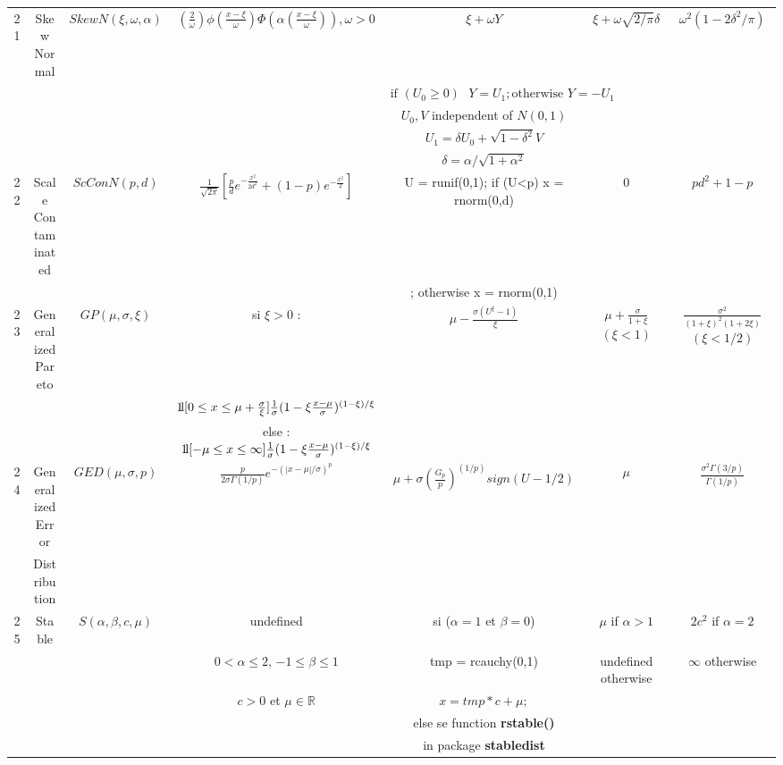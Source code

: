 \documentclass[10pt]{article}
\def\ind {\mbox {\rm 1\!\!\,l}} %
\begin{document}
\begin{landscape}
\begin{center}
{\begin{longtable}{|c|c|c|c|c|c|c|}
\hline
21 & Skew Normal & $SkewN(\xi,\omega,\alpha)$ & $\left(\frac{2}{\omega}\right)\phi\left(\frac{x-\xi}{\omega}\right)\Phi\left(\alpha\left(\frac{x-\xi}{\omega}\right)\right), \omega > 0$ & $\xi+\omega Y$& $\xi+\omega\sqrt{2/\pi}\delta$ & $\omega^2(1-2\delta^2/\pi)$\\
 & & & & $\text{if } (U_0 \geq 0) \text{ } Y = U_1; \text{otherwise } Y = -U_1$ & &\\
 & & & & $U_0, V$ independent of $N(0,1)$ & &\\
 & & & & $U_1=\delta U_0+\sqrt{1-\delta^2}V$ & &\\
 & & & & $\delta=\alpha/\sqrt{1+\alpha^2}$ & &\\
\hline
22 & Scale Contaminated & $ScConN(p,d)$ & $\frac{1}{\sqrt{2\pi}}\left[\frac{p}{d}e^{-\frac{x^2}{2d^2}}+(1-p)e^{-\frac{x^2}{2}}\right]$
         & U = runif(0,1); if (U<p) x = rnorm(0,d) & 0 & $pd^2+1-p$\\
   & & & & ; otherwise x = rnorm(0,1) & & \\
\hline
23 & Generalized Pareto & $GP(\mu,\sigma,\xi)$
   & si $\xi > 0$ : & $\mu-\frac{\sigma(U^{\xi}-1)}{\xi}$ & $\mu+\frac{\sigma}{1+\xi}$ $(\xi<1)$  & $\frac{\sigma^2}{(1+\xi)^2(1+2\xi)}$ $(\xi<1/2)$ \\
   & & & $\ind[0 \leq x \leq \mu+\frac{\sigma}{\xi}] \frac{1}{\sigma} (1-\xi\frac{x-\mu}{\sigma})^{(1-\xi)/\xi}$ & & &\\
   & & & else : $\ind[-\mu \leq x \leq \infty] \frac{1}{\sigma} (1-\xi\frac{x-\mu}{\sigma})^{(1-\xi)/\xi}$  & & &\\
\hline
24 & Generalized Error & $GED(\mu,\sigma,p)$ & $\frac{p}{2\sigma\Gamma(1/p)}e^{-\left(|x-\mu|/\sigma\right)^p}$ & $\mu+\sigma\left(\frac{G_p}{p}\right)^{(1/p)}sign(U-1/2)$ &  $\mu$ & $\frac{\sigma^2\Gamma(3/p)}{\Gamma(1/p)}$ \\
   & Distribution & & & & & \\
\hline
25 & Stable & $S(\alpha,\beta,c,\mu)$ & undefined & si ($\alpha = 1$ et $\beta = 0$) & $\mu$ if $\alpha > 1$ & $2c^2$ if $\alpha = 2$ \\
   & & & $0 < \alpha \leq 2$, $-1 \leq \beta \leq 1$ & tmp = rcauchy(0,1)            & undefined otherwise & $\infty$ otherwise \\
   & & & $c > 0$ et $\mu \in \mathbb{R}$            & $x = tmp * c + \mu;$           & & \\
   & & & & else se function \textbf{rstable()} & & \\
   & & & & in package \textbf{stabledist}   & & \\

\end{longtable}}
\end{center}
\end{landscape}
\end{document}
